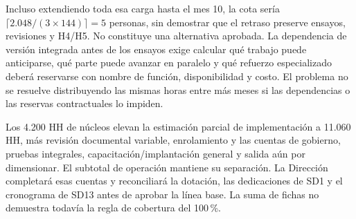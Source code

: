 Incluso extendiendo toda esa carga hasta el mes 10, la cota sería $\lceil2.048/(3\times144)\rceil=5$ personas, sin demostrar que el retraso preserve ensayos, revisiones y H4/H5. No constituye una alternativa aprobada. La dependencia de versión integrada antes de los ensayos exige calcular qué trabajo puede anticiparse, qué parte puede avanzar en paralelo y qué refuerzo especializado deberá reservarse con nombre de función, disponibilidad y costo. El problema no se resuelve distribuyendo las mismas horas entre más meses si las dependencias o las reservas contractuales lo impiden.

Los 4.200 HH de núcleos elevan la estimación parcial de implementación a 11.060 HH, más revisión documental variable, enrolamiento y las cuentas de gobierno, pruebas integrales, capacitación/implantación general y salida aún por dimensionar. El subtotal de operación mantiene su separación. La Dirección completará esas cuentas y reconciliará la dotación, las dedicaciones de SD1 y el cronograma de SD13 antes de aprobar la línea base. La suma de fichas no demuestra todavía la regla de cobertura del 100\,\%.
